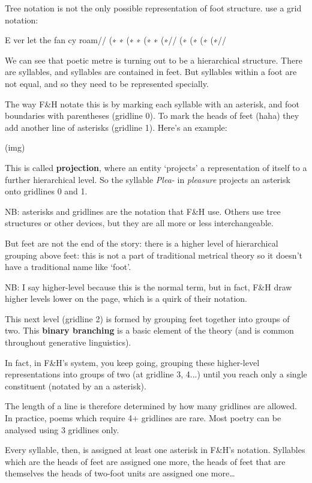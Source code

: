 \ex
Tree notation is not the only possible representation of foot structure. \Textcite{fabb2008meter} use a grid notation:

\begingl
\gla E ver  let the  fan cy  roam//
\glb (∗ ∗   (∗   ∗   (∗   ∗  (∗//
\glb (∗ {}  (∗   {}  (∗   {} (∗//
\endgl
\xe


We can see that poetic metre is turning out to be a hierarchical structure. There are syllables, and syllables are contained in feet. But syllables within a foot are not equal, and so they need to be represented specially.

The way F\&H notate this is by marking each syllable with an asterisk, and foot boundaries with parentheses (gridline 0). To mark the heads of feet (haha) they add another line of asterisks (gridline 1). Here’s an example:

(img)

This is called \textbf{projection}, where an entity `projects' a representation of itself to a further hierarchical level. So the syllable \textit{Plea-} in \textit{pleasure} projects an asterisk onto gridlines 0 and 1.

NB: asterisks and gridlines are the notation that F\&H use. Others use tree structures or other devices, but they are all more or less interchangeable.

But feet are not the end of the story: there is a higher level of hierarchical grouping above feet: this is not a part of traditional metrical theory so it doesn’t have a traditional name like `foot'.

NB: I say higher-level because this is the normal term, but in fact, F\&H draw higher levels lower on the page, which is a quirk of their notation.

This next level (gridline 2) is formed by grouping feet together into groups of two. This \textbf{binary branching} is a basic element of the theory (and is common throughout generative linguistics).

In fact, in F\&H’s system, you keep going, grouping these higher-level representations into groups of two (at gridline 3, 4...) until you reach only a single constituent (notated by an a asterisk).

The length of a line is therefore determined by how many gridlines are allowed. In practice, poems which require 4+ gridlines are rare. Most poetry can be analysed using 3 gridlines only.

Every syllable, then, is assigned at least one asterisk in F\&H’s notation. Syllables which are the heads of feet are assigned one more, the heads of feet that are themselves the heads of two-foot units are assigned one more…

